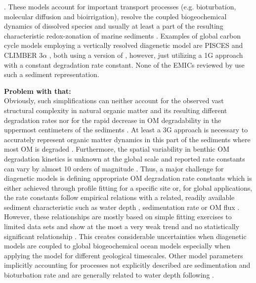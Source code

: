 \documentclass[gmd, manuscript]{copernicus}
\begin{document}
\citep[e.g.][]{berner_early_1980, boudreau1997diagenetic}. These models account for important transport processes (e.g. bioturbation, molecular diffusion and bioirrigation), resolve the coupled biogeochemical dynamics of dissolved species
and usually at least a part of the resulting characteristic redox-zonation of marine sediments \citep{soetaert_coupling_2000, huelse_biopump_models_2016}. Examples of global carbon cycle models employing a vertically resolved diagenetic model are 
PISCES \citep{gehlen_reconciling_2006} and CLIMBER 3$\alpha$ \citep{ilyina_global_2013}, both using a version of \citet{heinze_global_1999}, however, just utilizing a 1G approach with a constant degradation rate constant. %
None of the EMICs reviewed by \citet{huelse_biopump_models_2016} use such a sediment representation. 


\textbf{Problem with that:} \\
Obviously, such simplifications can neither account for the observed vast structural complexity in natural organic matter and its resulting different degradation rates nor for the rapid decrease in 
OM degradability in the uppermost centimeters of the sediments \citep{arndt_quantifying_2013}. At least a 3G approach is necessary to accurately represent organic matter dynamics in this part of the sediments where most OM is 
degraded \citep[e.g.][]{soetaert_model_1996}. 
Furthermore, the spatial variability in benthic OM degradation kinetics is unknown at the global scale and reported rate constants can vary by almost 10 orders of magnitude \citep{arndt_quantifying_2013}.
Thus, a major challenge for diagenetic models is defining appropriate OM degradation rate constants which is either achieved 
through profile fitting for a specific site or, for global applications, the rate constants follow empirical relations with a related, readily available sediment characteristic such as water depth 
\citep{middelburg_empirical_1997}, sedimentation rate \citep{toth_organic_1977, tromp_global_1995} or OM flux \citep{boudreau1997diagenetic}. 
However, these relationships are mostly based on simple fitting exercises to limited data sets and show at the most a very weak trend and no statistically significant relationship \citep{arndt_quantifying_2013}. 
This creates considerable uncertainties when diagenetic models are coupled to global biogeochemical ocean models especially when applying the model for different geological timescales. %
Other model parameters implicitly accounting for processes not explicitly described are sedimentation and bioturbation rate and are generally related to water depth following \citet{middelburg_empirical_1997}.
\end{document}
